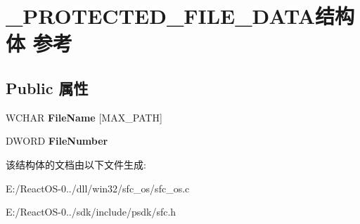\hypertarget{struct___p_r_o_t_e_c_t_e_d___f_i_l_e___d_a_t_a}{}\section{\+\_\+\+P\+R\+O\+T\+E\+C\+T\+E\+D\+\_\+\+F\+I\+L\+E\+\_\+\+D\+A\+T\+A结构体 参考}
\label{struct___p_r_o_t_e_c_t_e_d___f_i_l_e___d_a_t_a}
\subsection*{Public 属性}
\begin{DoxyCompactItemize}
\item 
\mbox{\label{struct___p_r_o_t_e_c_t_e_d___f_i_l_e___d_a_t_a_a4b79792a88de1b2544762d18b781ff46}} 
W\+C\+H\+AR {\bfseries File\+Name} \mbox{[}M\+A\+X\+\_\+\+P\+A\+TH\mbox{]}
\item 
\mbox{\label{struct___p_r_o_t_e_c_t_e_d___f_i_l_e___d_a_t_a_aa599c7adea1fda9077742eca54577ad9}} 
D\+W\+O\+RD {\bfseries File\+Number}
\end{DoxyCompactItemize}


该结构体的文档由以下文件生成\+:\begin{DoxyCompactItemize}
\item 
E\+:/\+React\+O\+S-\/0../dll/win32/sfc\+\_\+os/sfc\+\_\+os.\+c\item 
E\+:/\+React\+O\+S-\/0../sdk/include/psdk/sfc.\+h\end{DoxyCompactItemize}
